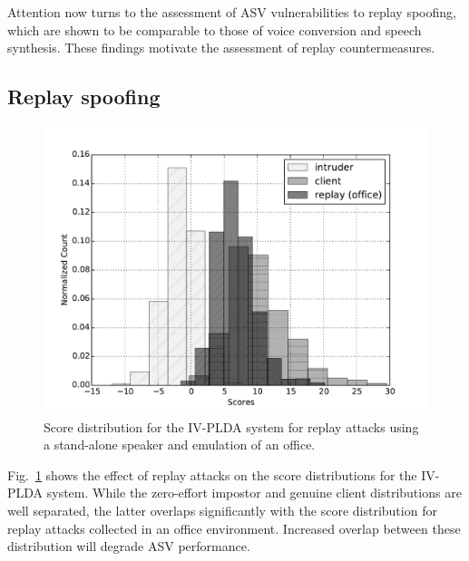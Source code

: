 
Attention now turns to the assessment of ASV vulnerabilities to replay spoofing, which are shown to be comparable to those of voice conversion and speech synthesis.  These findings motivate the assessment of replay countermeasures.


\subsection{Replay spoofing}


\begin{figure}[!t]
	\centering
	\includegraphics[width=1\linewidth]{Figs/dist_IV_off.pdf}
	\caption{Score distribution for the IV-PLDA system for replay attacks using a stand-alone speaker and emulation of an office.}
	\label{fig::Dist_IV}
\end{figure}


Fig.~\ref{fig::Dist_IV} shows the effect of replay attacks on the score distributions for the IV-PLDA system.  While the zero-effort impostor and genuine client distributions are well separated, the latter overlaps significantly with the score distribution for replay attacks collected in an office environment.  Increased overlap between these distribution will degrade ASV performance.


